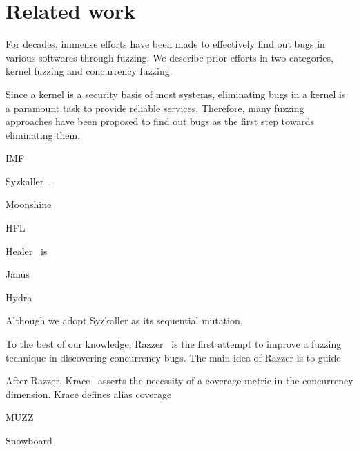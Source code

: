 \section{Related work}
\label{s:relwk}

For decades, immense efforts have been made to effectively find out
bugs in various softwares through fuzzing. We describe prior efforts
in two categories, kernel fuzzing and concurrency fuzzing.





%
Since a kernel is a security basis of most systems, eliminating bugs
in a kernel is a paramount task to provide reliable
services. Therefore, many fuzzing approaches have been proposed to
find out bugs as the first step towards eliminating them.
%

IMF~\cite{imf}

Syzkaller~\cite{syzkaller},

Moonshine~\cite{moonshine}

HFL~\cite{hfl}

Healer~\cite{healer} is

Janus~\cite{janus}

Hydra~\cite{hydra}


Although we adopt Syzkaller as its sequential mutation, 

%
To the best of our knowledge, Razzer~\cite{razzer} is the first
attempt to improve a fuzzing technique in discovering concurrency
bugs.
%
The main idea of Razzer is to guide


After Razzer, Krace~\cite{krace} asserts the necessity of a coverage
metric in the concurrency dimension. Krace defines alias coverage


MUZZ~\cite{muzz}


Snowboard~\cite{snowboard}



